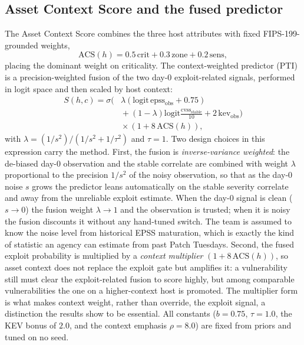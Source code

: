 \documentclass[journal]{IEEEtran}
\begin{document}
\subsection{Asset Context Score and the fused predictor}
The Asset Context Score combines the three host attributes with fixed FIPS-199-grounded weights,
\begin{equation}
\mathrm{ACS}(h) = 0.5\,\mathrm{crit} + 0.3\,\mathrm{zone} + 0.2\,\mathrm{sens},
\end{equation}
placing the dominant weight on criticality. The context-weighted predictor (PTI) is a
precision-weighted fusion of the two day-0 exploit-related signals, performed in logit space and
then scaled by host context:
\begin{equation}
\begin{split}
S(h,c)=\sigma\!\big(&\lambda(\mathrm{logit}\,\mathrm{epss_{obs}}{+}0.75) \\
&{}+(1{-}\lambda)\mathrm{logit}\tfrac{\mathrm{cvss_{stable}}}{10}+2\,\mathrm{kev_{obs}}\big) \\
&{}\times(1{+}8\,\mathrm{ACS}(h)),
\end{split}
\end{equation}
with $\lambda=(1/s^2)/(1/s^2+1/\tau^2)$ and $\tau{=}1$. Two design choices in this expression carry
the method. First, the fusion is \emph{inverse-variance weighted}: the de-biased day-0 observation
and the stable correlate are combined with weight $\lambda$ proportional to the precision $1/s^2$ of
the noisy observation, so that as the day-0 noise $s$ grows the predictor leans automatically on the
stable severity correlate and away from the unreliable exploit estimate. When the day-0 signal is
clean ($s \to 0$) the fusion weight $\lambda \to 1$ and the observation is trusted; when it is noisy
the fusion discounts it without any hand-tuned switch. The team is assumed to know the noise level
from historical EPSS maturation, which is exactly the kind of statistic an agency can estimate from
past Patch Tuesdays. Second, the fused exploit probability is multiplied by a \emph{context
multiplier} $(1 + 8\,\mathrm{ACS}(h))$, so asset context does not replace the exploit gate but
amplifies it: a vulnerability still must clear the exploit-related fusion to score highly, but among
comparable vulnerabilities the one on a higher-context host is promoted. The multiplier form is what
makes context weight, rather than override, the exploit signal, a distinction the results show to be
essential. All constants ($b{=}0.75$, $\tau{=}1.0$, the KEV bonus of $2.0$, and the context emphasis
$\rho{=}8.0$) are fixed from priors and tuned on no seed.
\end{document}
